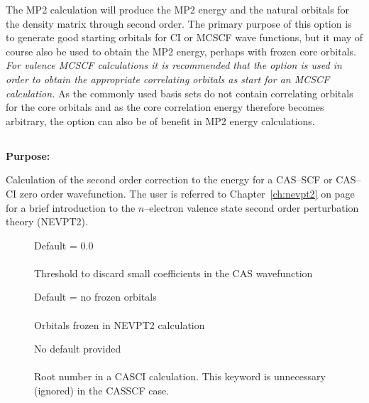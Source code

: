 The MP2 calculation will produce the MP2 energy and the natural orbitals
for the density matrix through second order.  The primary purpose of
this option is to generate good starting orbitals for CI or MCSCF wave
functions, but it
may of course also be used to obtain the MP2 energy, perhaps with frozen
core orbitals. {\em For valence MCSCF calculations it is recommended that the
 option is used in order to obtain the appropriate
correlating orbitals as start
for an MCSCF calculation.\/}  As the commonly
used basis sets do not contain correlating orbitals for the core
orbitals and as the core correlation energy therefore becomes arbitrary,
the  option can also be of benefit in MP2 energy
calculations.

\pagebreak[3]
\subsection{\label{ref-nevpt2inp}}

{\bf Purpose:}

Calculation of the second order correction to the energy for a
CAS--SCF or CAS--CI zero order wavefunction.
The user is referred to Chapter~\ref{ch:nevpt2} on
page~\pageref{ch:nevpt2}  for a brief
introduction to the $n$--electron valence state second order
perturbation theory (NEVPT2).

\begin{description}
\item[]
 Default = 0.0\\
   \\
  Threshold to discard small coefficients in the CAS wavefunction

\item[]
  Default = no frozen orbitals\\
   \\
  Orbitals frozen in NEVPT2 calculation

\item[]
 No default provided\\
 \\
Root number in a CASCI calculation. This keyword is unnecessary
(ignored) in the CASSCF case.
\end{description}




